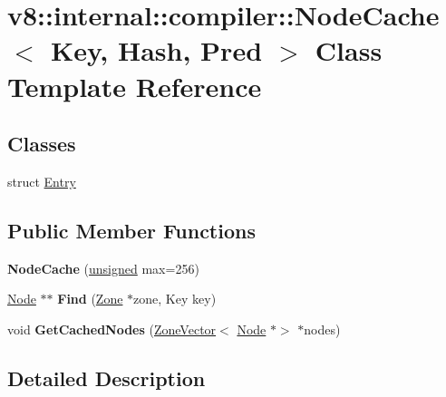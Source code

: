 \hypertarget{classv8_1_1internal_1_1compiler_1_1NodeCache}{}\section{v8\+:\+:internal\+:\+:compiler\+:\+:Node\+Cache$<$ Key, Hash, Pred $>$ Class Template Reference}
\label{classv8_1_1internal_1_1compiler_1_1NodeCache}
\subsection*{Classes}
\begin{DoxyCompactItemize}
\item 
struct \mbox{\hyperlink{structv8_1_1internal_1_1compiler_1_1NodeCache_1_1Entry}{Entry}}
\end{DoxyCompactItemize}
\subsection*{Public Member Functions}
\begin{DoxyCompactItemize}
\item 
\mbox{\label{classv8_1_1internal_1_1compiler_1_1NodeCache_a54b9055ef8f7ab3557bc22bae6afca9e}} 
{\bfseries Node\+Cache} (\mbox{\hyperlink{classunsigned}{unsigned}} max=256)
\item 
\mbox{\label{classv8_1_1internal_1_1compiler_1_1NodeCache_a216746465c6fb661212af18943e8c322}} 
\mbox{\hyperlink{classv8_1_1internal_1_1compiler_1_1Node}{Node}} $\ast$$\ast$ {\bfseries Find} (\mbox{\hyperlink{classv8_1_1internal_1_1Zone}{Zone}} $\ast$zone, Key key)
\item 
\mbox{\label{classv8_1_1internal_1_1compiler_1_1NodeCache_a9d23241721f7a665e6058636d9b2f7b5}} 
void {\bfseries Get\+Cached\+Nodes} (\mbox{\hyperlink{classv8_1_1internal_1_1ZoneVector}{Zone\+Vector}}$<$ \mbox{\hyperlink{classv8_1_1internal_1_1compiler_1_1Node}{Node}} $\ast$$>$ $\ast$nodes)
\end{DoxyCompactItemize}


\subsection{Detailed Description}

